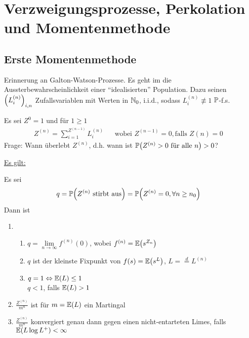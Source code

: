 
\section{Verzweigungsprozesse, Perkolation und Momentenmethode}

\subsection{Erste Momentenmethode}

Erinnerung an Galton-Watson-Prozesse. Es geht im die Aussterbewahrscheinlichkeit einer \enquote{idealisierten} Population. Dazu seinen $\left(L^{(n)}_i\right)_{i,n}$ Zufallsvariablen mit Werten in $\mathbb{N}_0$, i.i.d., sodass $L^{(n)}_i \not\equiv 1$ $\mathbb{P}$-f.s. 

Es sei $Z^0 = 1$ und für $1 \geq 1$
\begin{align}
	Z^{(n)} = \sum\limits_{i = 1}^{Z^{(n-1)}} L_i^{(n)} && \text{wobei } Z^{(n-1)} = 0, \text{falls } Z{(n)}  = 0
\end{align}
Frage: Wann überlebt $Z^{(n)}$, d.h. wann ist $\prop{Z^{(n)} > 0\text{ für alle }n} > 0$?

\underline{Es gilt:} \\
\begin{satz}
	Es sei 
	\begin{align}
		q = \propE{Z^{(n)} \text{ stirbt aus} } = \propE{Z^{(n)} = 0, \forall n \geq n_0}
	\end{align}
	Dann ist 
	\begin{enumerate}[a]
	
		\item
			\begin{enumerate}
				\item $q = \lim\limits_{n \to \infty} f^{(n)}(0)$, wobei $f^{(n)} = \EW{s^{Z_n}}$
				\item $q$ ist der kleinste Fixpunkt von $f(s) = \EW{s^L}$, $L = \overset{d}{=} L^(n)$
				\item $q = 1 \Leftrightarrow \EW{L} \leq 1$ \\ $q<1$, falls $\EW{L} > 1$
			\end{enumerate}
		\item $\frac{Z^{(n)}}{m^n}$  ist für $m = \EW{L}$ ein Martingal
		\item $\frac{Z^{(n)}}{m^n}$ konvergiert genau dann gegen einen nicht-entarteten Limes, falls $\EW{L \log L^+} < \infty$
	\end{enumerate}
\end{satz}

